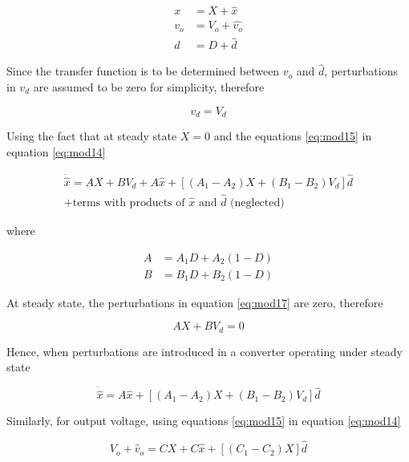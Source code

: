\documentclass[a4paper]{IEEEtran}
\begin{document}
	\begin{equation}
		\begin{split}
			x &= X + \hat{x}\\
			v_o &= V_o + \hat{v_o}\\
			d &= D + \hat{d}
		\end{split}
		\label{eq:mod15}
	\end{equation} 
	
	Since the transfer function is to be determined between $\hat{v_o}$ and $\hat{d}$, perturbations in $v_d$ are assumed to be zero for simplicity, therefore
	
	\begin{equation}
		v_d = V_d
		\label{eq:mod16}
	\end{equation}
	
	Using the fact that at steady state $\dot{X} = 0$ and the equations \eqref{eq:mod15} in equation \eqref{eq:mod14}
	
	\begin{multline}
		\dot{\hat{x}} = AX + BV_d + A\hat{x} + [(A_1-A_2)X+(B_1-B_2)V_d]\hat{d} \\+ \text{terms with products of $\hat{x}$ and $\hat{d}$ (neglected)} 
		\label{eq:mod17}
	\end{multline}
	
	where
	
	\begin{align}
		A &= A_1D+A_2(1-D)\\
		B &= B_1D+B_2(1-D)
		\label{eq:mod18}
	\end{align}
	
	At steady state, the perturbations in equation \eqref{eq:mod17} are zero, therefore
	
	\begin{equation}
		AX+BV_d=0
		\label{eq:mod19}
	\end{equation}
	
	Hence, when perturbations are introduced in a converter operating under steady state
	
	\begin{equation}
		\dot{\hat{x}} = A\hat{x} + [(A_1-A_2)X+(B_1-B_2)V_d]\hat{d}
		\label{eq:mod20}
	\end{equation}

	Similarly, for output voltage, using equations \eqref{eq:mod15} in equation \eqref{eq:mod14}
	
	\begin{equation}
		V_o + \hat{v}_o = CX + C\hat{x} + [(C_1-C_2)X]\hat{d}
		\label{eq:mod21}
	\end{equation}
	
\end{document}
